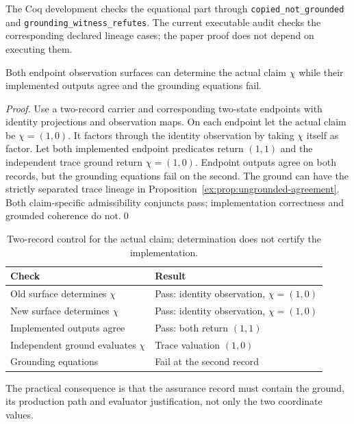\documentclass[smallextended,envcountsect,envcountsame,natbib]{svjour3}
\newcommand{\code}[1]{\texttt{#1}}
\begin{document}
The Coq development checks the equational part through \code{copied\_\allowbreak not\_\allowbreak grounded} and \code{grounding\_\allowbreak witness\_\allowbreak refutes}. The current executable audit checks the corresponding declared lineage cases; the paper proof does not depend on executing them.

\begin{proposition}\label{ex:prop:claim-control}
Both endpoint observation surfaces can determine the actual claim $\chi$ while their implemented outputs agree and the grounding equations fail.
\end{proposition}
\begin{proof}
Use a two-record carrier and corresponding two-state endpoints with identity projections and observation maps. On each endpoint let the actual claim be $\chi=(1,0)$. It factors through the identity observation by taking $\chi$ itself as factor. Let both implemented endpoint predicates return $(1,1)$ and the independent trace ground return $\chi=(1,0)$. Endpoint outputs agree on both records, but the grounding equations fail on the second. The ground can have the strictly separated trace lineage in Proposition~\ref{ex:prop:ungrounded-agreement}. Both claim-specific admissibility conjuncts pass; implementation correctness and grounded coherence do not.\qed
\end{proof}

\begin{table}[htbp]
\centering\small
\caption{Two-record control for the actual claim; determination does not certify the implementation.}\label{ex:tab:claim-control}
\begin{tabularx}{\textwidth}{@{}lL@{}}
\toprule
Check & Result \\
\midrule
Old surface determines $\chi$ & Pass: identity observation, $\chi=(1,0)$ \\
New surface determines $\chi$ & Pass: identity observation, $\chi=(1,0)$ \\
Implemented outputs agree & Pass: both return $(1,1)$ \\
Independent ground evaluates $\chi$ & Trace valuation $(1,0)$ \\
Grounding equations & Fail at the second record \\
\bottomrule
\end{tabularx}
\end{table}

The practical consequence is that the assurance record must contain the ground, its production path and evaluator justification, not only the two coordinate values.
\end{document}
